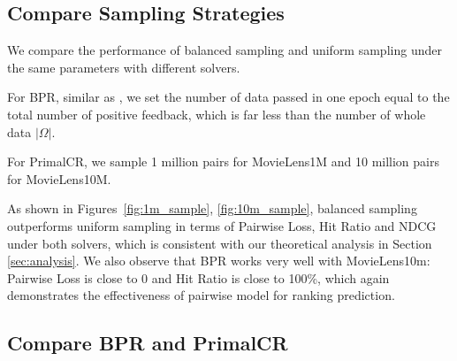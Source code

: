 \documentclass[conference]{IEEEtran}
\numberwithin{equation}{section}
\newtheorem{sampling strategy}{Sampling Strategy}
\begin{document}
\subsection{Compare Sampling Strategies}

We compare the performance of balanced sampling and uniform sampling under the same parameters with different solvers. 

For \textsf{BPR}, similar as \cite{bpr}, we set the number of data passed in one epoch equal to the total number of positive feedback, which is far less than the number of whole data $|\Omega|$.

For \textsf{PrimalCR}, we sample 1 million pairs for MovieLens1M and 10 million pairs for MovieLens10M.

As shown in Figures~\ref{fig:1m_sample}, \ref{fig:10m_sample}, balanced sampling outperforms uniform sampling in terms of Pairwise Loss, Hit Ratio and NDCG under both solvers, which is consistent with our theoretical analysis in Section \ref{sec:analysis}. We also observe that BPR works very well with MovieLens10m: Pairwise Loss is close to 0 and Hit Ratio is close to 100\%, which again demonstrates the effectiveness of pairwise model for ranking prediction.




\subsection{Compare \textsf{BPR} and \textsf{PrimalCR}}
\end{document}
